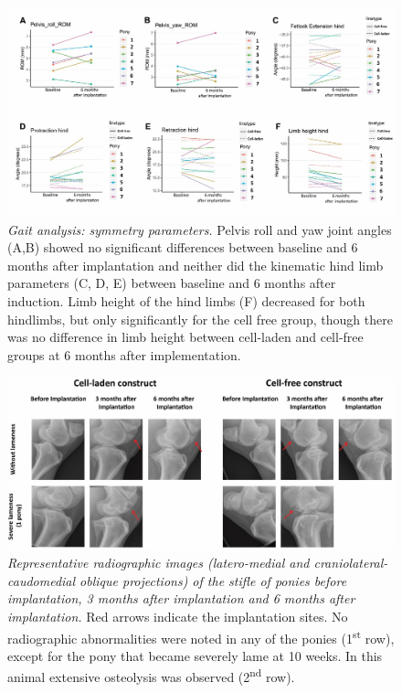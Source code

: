 \documentclass[twocolumn, empirical, authordate, issue]{jote-new-article}
\begin{document}
\begin{figure}
\centering \includegraphics[width=\columnwidth]{media/image12.jpg}
\caption{\emph{Gait analysis: symmetry parameters.}
 Pelvis roll and yaw joint angles (A,B) showed no significant differences between baseline and 6 months after implantation and neither did the kinematic hind limb parameters (C, D, E) between baseline and 6 months after induction. Limb height of the hind limbs (F) decreased for both hindlimbs, but only significantly for the cell free group, though there was no difference in limb height between cell-laden and cell-free groups at 6 months after implementation.}
\label{fig:sup1}\end{figure}



\begin{figure}
\centering \includegraphics[width=\columnwidth]{media/image13.jpg}
\caption{\emph{Representative radiographic images (latero-medial and craniolateral-caudomedial oblique projections) of the stifle of ponies before implantation, 3 months after implantation and 6 months after implantation.}  Red arrows indicate the implantation sites. No radiographic abnormalities were noted in any of the ponies (1\textsuperscript{st} row), except for the pony that became severely lame at 10 weeks. In this animal extensive osteolysis was observed (2\textsuperscript{nd} row).}
\label{fig:sup2}\end{figure}
\end{document}

